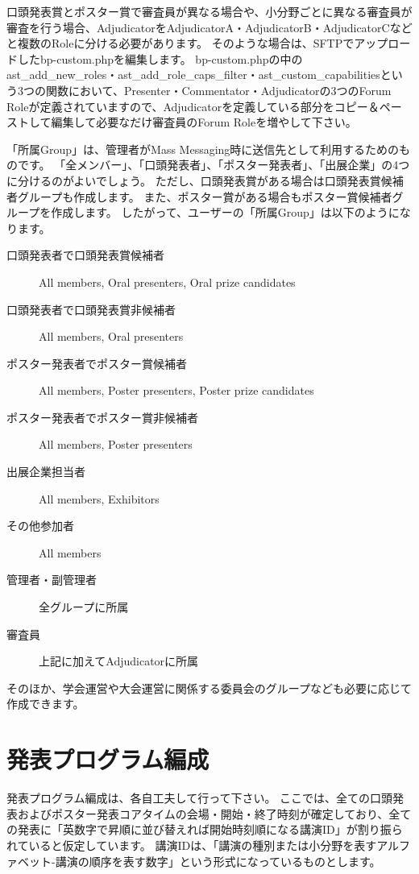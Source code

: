 \documentclass[titlepage,10pt,a4paper,uplatex]{jsbook}
\begin{document}
口頭発表賞とポスター賞で審査員が異なる場合や、小分野ごとに異なる審査員が審査を行う場合、AdjudicatorをAdjudicatorA・AdjudicatorB・AdjudicatorCなどと複数のRoleに分ける必要があります。
そのような場合は、SFTPでアップロードしたbp-custom.phpを編集します。
bp-custom.phpの中のast\_add\_new\_roles・ast\_add\_role\_caps\_filter・ast\_custom\_capabilitiesという3つの関数において、Presenter・Commentator・Adjudicatorの3つのForum Roleが定義されていますので、Adjudicatorを定義している部分をコピー＆ペーストして編集して必要なだけ審査員のForum Roleを増やして下さい。

「所属Group」は、管理者がMass Messaging時に送信先として利用するためのものです。
「全メンバー」、「口頭発表者」、「ポスター発表者」、「出展企業」の4つに分けるのがよいでしょう。
ただし、口頭発表賞がある場合は口頭発表賞候補者グループも作成します。
また、ポスター賞がある場合もポスター賞候補者グループを作成します。
したがって、ユーザーの「所属Group」は以下のようになります。

\begin{description}
\item[口頭発表者で口頭発表賞候補者] All members, Oral presenters, Oral prize candidates
\item[口頭発表者で口頭発表賞非候補者] All members, Oral presenters
\item[ポスター発表者でポスター賞候補者] All members, Poster presenters, Poster prize candidates
\item[ポスター発表者でポスター賞非候補者] All members, Poster presenters
\item[出展企業担当者] All members, Exhibitors
\item[その他参加者] All members
\item[管理者・副管理者] 全グループに所属
\item[審査員] 上記に加えてAdjudicatorに所属
\end{description}

そのほか、学会運営や大会運営に関係する委員会のグループなども必要に応じて作成できます。

\section{発表プログラム編成}

発表プログラム編成は、各自工夫して行って下さい。
ここでは、全ての口頭発表およびポスター発表コアタイムの会場・開始・終了時刻が確定しており、全ての発表に「英数字で昇順に並び替えれば開始時刻順になる講演ID」が割り振られていると仮定しています。
講演IDは、「講演の種別または小分野を表すアルファベット-講演の順序を表す数字」という形式になっているものとします。
\end{document}
